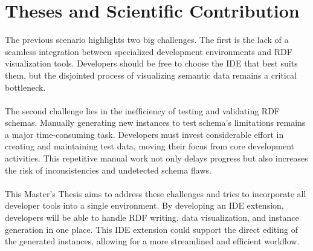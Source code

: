 \section{Theses and Scientific Contribution  \label{sec:objective}}
The previous scenario highlights two big challenges. The first is the lack of a seamless integration between specialized development environments and RDF visualization tools. 
Developers should be free to choose the IDE that best suits them, but the disjointed process of visualizing semantic data remains a critical bottleneck.
\\
\\
The second challenge lies in the inefficiency of testing and validating RDF schemas. Manually generating new instances to test schema's limitations remains a major time-consuming task. Developers must invest considerable effort in creating and maintaining test data, moving their focus from core development activities. This repetitive manual work not only delays progress but also increases the risk of inconsistencies and undetected schema flaws.
\\
\\
This Master's Thesis aims to address these challenges and tries to incorporate all developer tools into a single environment.
By developing an IDE extension, developers will be able to handle RDF writing, data visualization, and instance generation in one place.
This IDE extension could support the direct editing of the generated instances, allowing for a more streamlined and efficient workflow.


